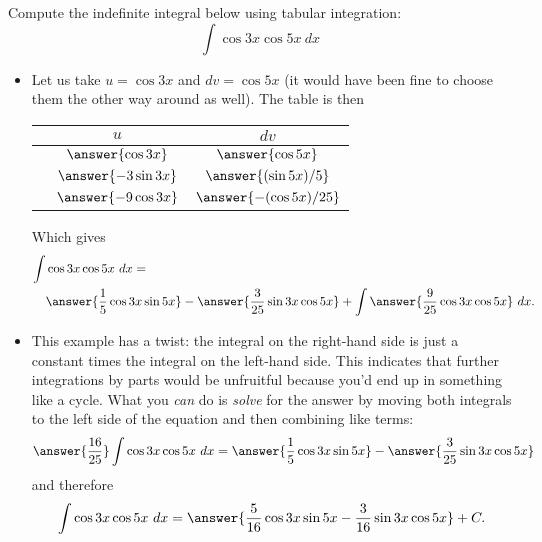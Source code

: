 \documentclass{ximera}
\begin{document}
\begin{example}
Compute the indefinite integral below using tabular integration:
\[ \int \cos 3x \cos 5x ~dx \]
\begin{itemize}
\item Let us take $u = \cos 3x$ and $dv = \cos 5x$ (it would have been fine to choose them the other way around as well). The table is then
\begin{center}
\begin{tabular}{ccc}
& $u$ & $dv$ \\
\hline
& $\answer{\cos 3x}$ & $\answer{\cos 5x}$ \\
& $\answer{-3 \sin 3 x}$ & $\answer{(\sin 5x)/5}$ \\
& $\answer{-9 \cos 3x}$ & $\answer{-(\cos 5x)/25}$
\end{tabular}
\end{center}
Which gives
\[ \begin{aligned} \int & \cos 3x \cos 5x ~dx = \\ & \answer{ \frac{1}{5} \cos 3x \sin 5x} - \answer{\frac{3}{25} \sin 3x \cos 5x} + \int \answer{\frac{9}{25} \cos 3x \cos 5x} ~dx. \end{aligned} \]
\item This example has a twist: the integral on the right-hand side is just a constant times the integral on the left-hand side. This indicates that further integrations by parts would be unfruitful because you'd end up in something like a cycle.  What you \textit{can} do is \textit{solve} for the answer by moving both integrals to the left side of the equation and then combining like terms:
\[ \answer{\frac{16}{25}} \int  \cos 3x \cos 5x ~dx =  \answer{ \frac{1}{5} \cos 3x \sin 5x} - \answer{\frac{3}{25} \sin 3x \cos 5x} \]
and therefore
\[ \int \cos 3x \cos 5x ~ dx = \answer{  \frac{5}{16} \cos 3x \sin 5x - \frac{3}{16} \sin 3x \cos 5x} + C. \]
\end{itemize}
\end{example}
\end{document}
